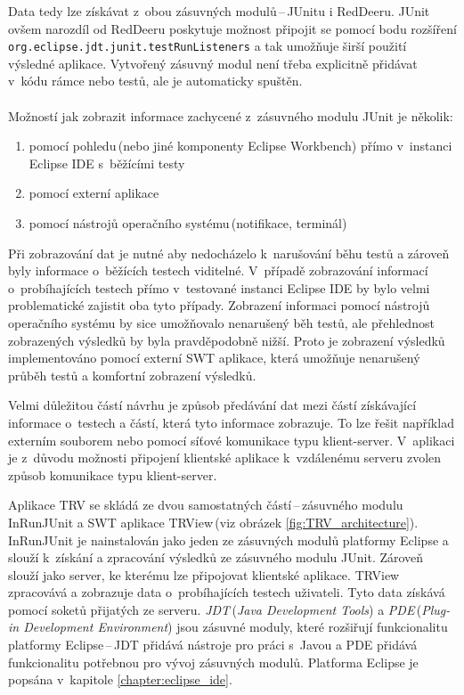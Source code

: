   Data tedy lze získávat z~obou zásuvných modulů\,--\,JUnitu i RedDeeru. JUnit ovšem narozdíl od RedDeeru poskytuje možnost připojit se pomocí bodu rozšíření\\\texttt{org.eclipse.jdt.junit.testRunListeners} a tak umožňuje širší použití výsledné aplikace. Vytvořený zásuvný modul není třeba explicitně přidávat v~kódu rámce nebo testů, ale je automaticky spuštěn.
  \\
  \\
  \noindent
  Možností jak zobrazit informace zachycené z~zásuvného modulu JUnit je několik:
  \begin{enumerate}
   \item pomocí pohledu\,(nebo jiné komponenty Eclipse Workbench) přímo v~instanci Eclipse IDE s~běžícími testy
   \item pomocí externí aplikace
   \item pomocí nástrojů operačního systému\,(notifikace, terminál)
  \end{enumerate}

  Při zobrazování dat je nutné aby nedocházelo k~narušování běhu testů a zároveň byly informace o~běžících testech viditelné. V~případě zobrazování informací o~probíhajících testech přímo v~testované instanci Eclipse IDE by bylo velmi problematické zajistit oba tyto případy. Zobrazení informaci pomocí nástrojů operačního systému by sice umožňovalo nenarušený běh testů, ale přehlednost zobrazených výsledků by byla pravděpodobně nižší. Proto je zobrazení výsledků implementováno pomocí externí SWT aplikace, která umožňuje nenarušený průběh testů a komfortní zobrazení výsledků.

  Velmi důležitou částí návrhu je způsob předávání dat mezi částí získávající informace o~testech a částí, která tyto informace zobrazuje. To lze řešit například externím souborem nebo pomocí síťové komunikace typu klient-server. V~aplikaci je z~důvodu možnosti připojení klientské aplikace k~vzdálenému serveru zvolen způsob komunikace typu klient-server.

  Aplikace TRV se skládá ze dvou samostatných částí\,--\,zásuvného modulu InRunJUnit a SWT aplikace TRView\,(viz obrázek \ref{fig:TRV_architecture}). InRunJUnit je nainstalován jako jeden ze zásuvných modulů platformy Eclipse a slouží k~získání a zpracování výsledků ze zásuvného modulu JUnit. Zároveň slouží jako server, ke kterému lze připojovat klientské aplikace. TRView zpracovává a zobrazuje data o~probíhajících testech uživateli. Tyto data získává pomocí soketů přijatých ze serveru. \emph{JDT}\,(\emph{Java Development Tools}) a \emph{PDE}\,(\emph{Plug-in Development Environment}) jsou zásuvné moduly, které rozšiřují funkcionalitu platformy Eclipse\,--\,JDT přidává nástroje pro práci s~Javou a PDE přidává funkcionalitu potřebnou pro vývoj zásuvných modulů. Platforma Eclipse je popsána v~kapitole \ref{chapter:eclipse_ide}.

